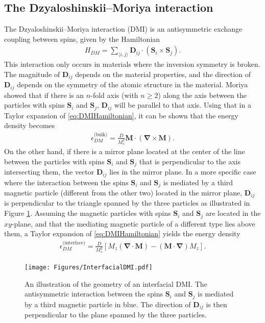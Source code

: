 \documentclass[12pt, a4paper, twoside, openright]{report}
\numberwithin{equation}{chapter}
\numberwithin{figure}{chapter}
\numberwithin{table}{chapter}
\begin{document}
\subsection{The Dzyaloshinskii--Moriya interaction}
The Dzyaloshinskii--Moriya interaction (DMI) is an antisymmetric exchange coupling between spins, given by the Hamiltonian
\begin{align}
H_{DM} = \sum_{\langle i,j\rangle}\mathbold{D}_{ij}\cdot(\mathbold{S}_i\times\mathbold{S}_j). \label{eq:DMIHamiltonian}
\end{align}
This interaction only occurs in materials where the inversion symmetry is broken. The magnitude of $\mathbold{D}_{ij}$ depends on the material properties, and the direction of $\mathbold{D}_{ij}$ depends on the symmetry of the atomic structure in the material. Moriya showed \cite{Moriya1960} that if there is an $n$-fold axis (with $n \geq 2$) along the axis between the particles with spins $\mathbold{S}_i$ and $\mathbold{S}_j$, $\mathbold{D}_{ij}$ will be parallel to that axis. Using that in a Taylor expansion of \eqref{eq:DMIHamiltonian}, it can be shown that the energy density becomes
\begin{align}
\epsilon_{DM}^{\textrm{(bulk)}} = \frac{D}{M_s^2}\mathbold{M}\cdot(\mathbold{\nabla}\times\mathbold{M}).
\end{align}
On the other hand, if there is a mirror plane located at the center of the line between the particles with spins $\mathbold{S}_i$ and $\mathbold{S}_j$ that is perpendicular to the axis intersecting them, the vector $\mathbold{D}_{ij}$ lies in the mirror plane. In a more specific case where the interaction between the spins $\mathbold{S}_i$ and $\mathbold{S}_j$ is mediated by a third magnetic particle (different from the other two) located in the mirror plane, $\mathbold{D}_{ij}$ is perpendicular to the triangle spanned by the three particles as illustrated in Figure \ref{fig:InterfacialDMI}. Assuming the magnetic particles with spins $\mathbold{S}_i$ and $\mathbold{S}_j$ are located in the $xy$-plane, and that the mediating magnetic particle of a different type lies above them, a Taylor expansion of \eqref{eq:DMIHamiltonian} yields the energy density
\begin{align}
\label{eq:DMInterface}
\epsilon_{DM}^{\textrm{(interface)}} = \frac{D}{M_s^2}\left[M_z(\mathbold{\nabla}\cdot\mathbold{M})-(\mathbold{M}\cdot\mathbold{\nabla})M_z\right].
\end{align}
\begin{figure}[h!]
\begin{center}
\texttt{[image: Figures/InterfacialDMI.pdf]} 
\caption{An illustration of the geometry of an interfacial DMI. The antisymmetric interaction between the spins $\mathbold{S}_i$ and $\mathbold{S}_j$ is mediated by a third magnetic particle in blue. The direction of $\mathbold{D}_{ij}$ is then perpendicular to the plane spanned by the three particles.}
\label{fig:InterfacialDMI} 
\end{center}
\end{figure}
\end{document}
